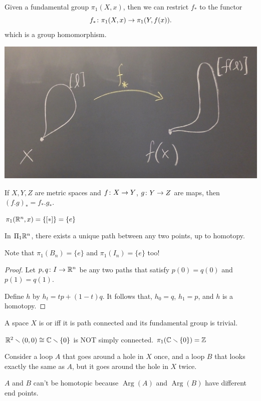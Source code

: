 \documentclass[11pt,leqno,oneside]{amsart}
\numberwithin{thm}{section}
\newcommand{\minus}{\smallsetminus}
\newcommand{\fund}[1][1]{\pi_{#1}}
\newcommand{\Arg}{\operatorname{Arg}}
\begin{document}
\begin{prop}
  Given a fundamental group $\fund(X, x)$, then we can restrict $f_*$
  to the functor $$f_* \from \fund(X, x) \to \fund(Y, f(x)).$$ which is a group homomorphism.

  \includegraphics[scale=0.17]{images/fundamental-functor}
\end{prop}
\begin{prop}
  If $X,Y,Z$ are metric spaces and $f \colon X \to Y$, $g \colon Y \to Z$ are
  maps, then ${(f.g)}_* = f_*.g_*$.
\end{prop}

\begin{example}
  $\fund(\R^n, x) = \{[*]\} = \{e\}$

  In $\Pi_1 {\mathbb R}^n$, there exists a unique path between any two points,
  up to homotopy.

  Note that $\fund(B_n) = \{e\}$ and $\fund(I_n) = \{e\}$ too!
\end{example}
\begin{proof}
  Let $p,q \colon I \to {\mathbb R}^n$ be any two paths that satisfy $p(0) = q(0)$ and $p(1) = q(1)$.

  Define $h$ by $h_t = tp + (1-t)q$.  It follows that, $h_0 = q$, $h_1 = p$, and $h$ is a homotopy.
\end{proof}

\begin{defn} %
  A space $X$ is  or  iff it is path connected and its
  fundamental group is trivial.
\end{defn}
\begin{example}
  $\R^2 \minus (0,0) \isom \C \minus \{0\}$ is NOT simply connected.
  $\fund(\C \minus \{0\}) = \Z$
\end{example}
\begin{example}
  Consider a loop $A$ that goes around a hole in $X$ once, and a loop $B$ that looks exactly the same as $A$, but it goes around the hole in $X$ twice.

  $A$ and $B$ can't be homotopic because $\Arg(A)$ and $\Arg(B)$ have
  different end points.
\end{example}
\end{document}
